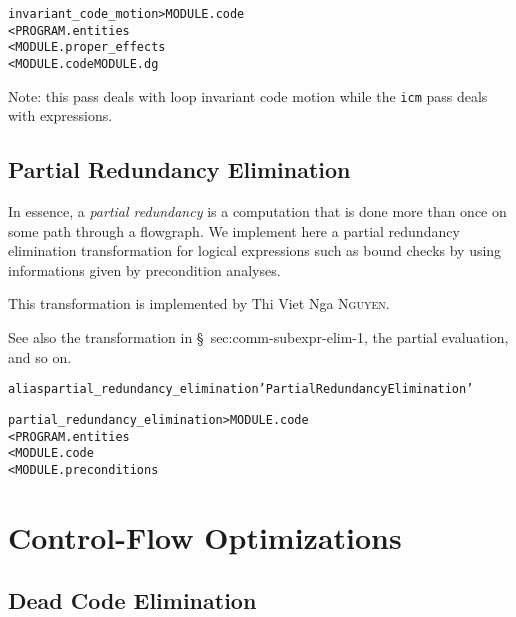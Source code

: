 \documentclass[a4paper]{report}
\newenvironment{PipsMake}{\begin{alltt}}{\end{alltt}}
\newenvironment{PipsPass}[1]{\label{pass:#1}}{}
\begin{document}
\begin{PipsMake}
invariant_code_motion             > MODULE.code
        < PROGRAM.entities
        < MODULE.proper_effects
        < MODULE.code MODULE.dg
\end{PipsMake}

Note: this pass deals with loop invariant code motion while the
\verb/icm/ pass deals with expressions.


\subsection{Partial Redundancy Elimination}
\label{subsection-partial_redundancy_elimination}


\begin{PipsPass}{partial_redundancy_elimination}

In essence, a {\it partial redundancy} \cite{Muc97} is a computation that is
done more than once on some path through a flowgraph. We implement here a
partial redundancy elimination transformation for logical
expressions such as bound checks by using informations given by
precondition analyses.

This transformation is implemented by Thi Viet Nga \textsc{Nguyen}.
\end{PipsPass}

See also the transformation in \S~{sec:comm-subexpr-elim-1}, the partial
evaluation, and so on.

\begin{PipsMake}
alias partial_redundancy_elimination 'Partial Redundancy Elimination'

partial_redundancy_elimination             > MODULE.code
        < PROGRAM.entities
        < MODULE.code
        < MODULE.preconditions
\end{PipsMake}




\section{Control-Flow Optimizations}


\subsection{Dead Code Elimination}
\label{sec:dead-code-elimination}
\end{document}
